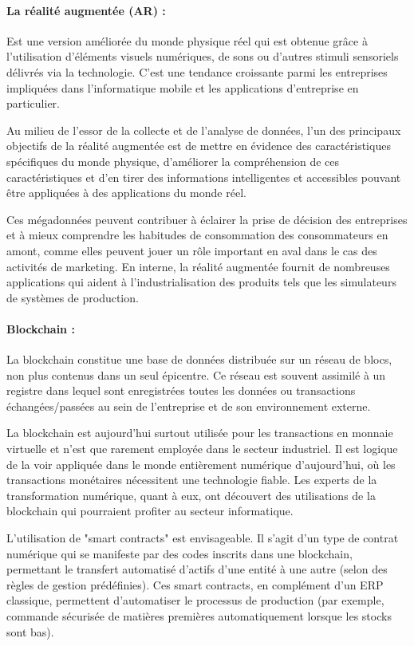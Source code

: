 \paragraph{La réalité augmentée (AR) :}

Est une version améliorée du monde physique réel qui est obtenue grâce à l'utilisation d'éléments visuels numériques, de sons ou d'autres stimuli sensoriels délivrés via la technologie. C'est une tendance croissante parmi les entreprises impliquées dans l'informatique mobile et les applications d'entreprise en particulier.

Au milieu de l'essor de la collecte et de l'analyse de données, l'un des principaux objectifs de la réalité augmentée est de mettre en évidence des caractéristiques spécifiques du monde physique, d'améliorer la compréhension de ces caractéristiques et d'en tirer des informations intelligentes et accessibles pouvant être appliquées à des applications du monde réel.

Ces mégadonnées peuvent contribuer à éclairer la prise de décision des entreprises et à mieux comprendre les habitudes de consommation des consommateurs en amont, comme elles peuvent jouer un rôle important en aval dans le cas des activités de marketing. En interne, la réalité augmentée fournit de nombreuses applications qui aident à l'industrialisation des produits tels que les simulateurs de systèmes de production.

\paragraph{Blockchain :}

La blockchain constitue une base de données distribuée sur un réseau de blocs, non plus contenus dans un seul épicentre. Ce réseau est souvent assimilé à un registre dans lequel sont enregistrées toutes les données ou transactions échangées/passées au sein de l'entreprise et de son environnement externe.

La blockchain est aujourd'hui surtout utilisée pour les transactions en monnaie virtuelle et n'est que rarement employée dans le secteur industriel. Il est logique de la voir appliquée dans le monde entièrement numérique d'aujourd'hui, où les transactions monétaires nécessitent une technologie fiable. Les experts de la transformation numérique, quant à eux, ont découvert des utilisations de la blockchain qui pourraient profiter au secteur informatique.

L'utilisation de "smart contracts" est envisageable. Il s'agit d'un type de contrat numérique qui se manifeste par des codes inscrits dans une blockchain, permettant le transfert automatisé d'actifs d'une entité à une autre (selon des règles de gestion prédéfinies). Ces smart contracts, en complément d'un ERP classique, permettent d'automatiser le processus de production (par exemple, commande sécurisée de matières premières automatiquement lorsque les stocks sont bas).

